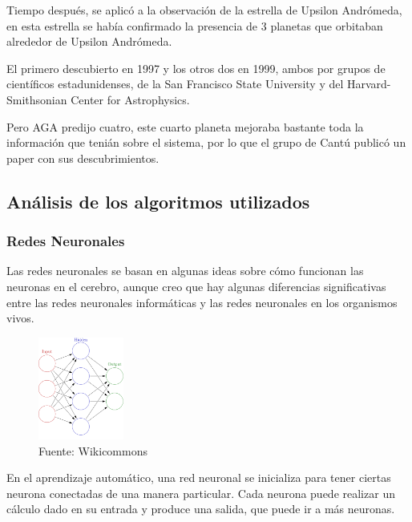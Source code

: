 \documentclass[fleqn, journal]{IEEEtran}                        %
\theoremstyle{break}                                            %
\begin{document}
                Tiempo después, se aplicó a la observación de la estrella de Upsilon Andrómeda, en esta
                estrella se había confirmado la presencia de 3 planetas que orbitaban alrededor de Upsilon Andrómeda.
                
                El primero descubierto en 1997 y los otros dos en 1999, ambos por grupos de científicos estadunidenses,
                de la San Francisco State University y del Harvard-Smithsonian Center for Astrophysics.

                Pero AGA predijo cuatro, este cuarto planeta mejoraba bastante toda la información que tenián sobre
                el sistema, por lo que el grupo de Cantú publicó un paper con sus descubrimientos.
                \cite{wea4}
            
        \subsection{Análisis de los algoritmos utilizados}
                
            \vspace{1em}
            \subsubsection{Redes Neuronales}

                Las redes neuronales se basan en algunas ideas sobre cómo funcionan las neuronas en el cerebro,
                aunque creo que hay algunas diferencias significativas entre las redes neuronales informáticas y
                las redes neuronales en los organismos vivos.

                \begin{figure}[h]
                    \includegraphics[width=0.25\textwidth]{redes}
                    \caption{Fuente: Wikicommons}
                \end{figure}

                En el aprendizaje automático, una red neuronal se inicializa para tener ciertas neurona
                conectadas de una manera particular. Cada neurona puede realizar un cálculo dado en su entrada y
                produce una salida, que puede ir a más neuronas.
\end{document}
